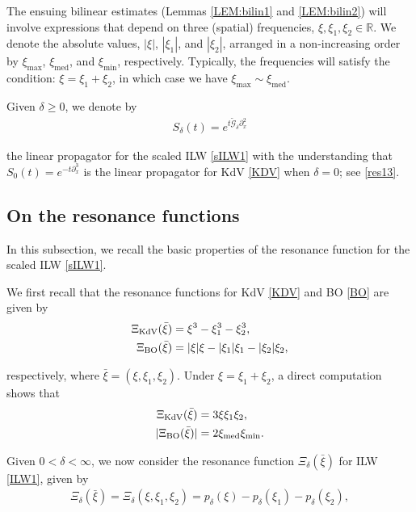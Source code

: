 \documentclass[letterpaper, 11pt,  reqno]{amsart}
\DeclareMathOperator{\med}{med}
\newcommand{\1}{\hspace{0.5mm}\textup{I}\hspace{0.5mm}}
\newcommand{\noi}{\noindent}
\newcommand{\R}{\mathbb{R}}
\newcommand{\dl}{\delta}
\newcommand{\wt}{\widetilde}
\newcommand{\dx}{\partial_x}
\newcommand{\Gd}{\wt{\mathcal{G}}_\dl}
\newcommand{\BO}{\text{\rm BO} }
\newcommand{\KDV}{\text{\rm KdV} }
\numberwithin{equation}{section}
\numberwithin{theorem}{section}
\begin{document}
The ensuing bilinear estimates (Lemmas \ref{LEM:bilin1}
and
\ref{LEM:bilin2})
will involve expressions that depend on three 
(spatial) frequencies, $\xi, \xi_1, \xi_2 \in \R$. 
We denote the absolute values,  $|\xi|$, $|\xi_1|$, and $|\xi_2|$,
arranged in a non-increasing order by 
 $\xi_{\max}$, 
$\xi_{\med}$, and $\xi_{\min}$, respectively. Typically, the frequencies will satisfy the
 condition: \(\xi = \xi_1 + \xi_2\), in which case we  have \(\xi_{\max}\sim \xi_{\med}\).





Given $\dl \ge 0$, 
we denote
by  
\begin{align}
S_\dl(t) = e^{ t \Gd \dx^2}
\label{lin1}
\end{align}


\noi
 the linear propagator for the scaled ILW \eqref{sILW1}
with the understanding that 
$S_0(t) = e^{-t\dx^3}$ 
is 
 the linear propagator for KdV \eqref{KDV}
 when $\dl = 0$;
 see \eqref{res13}.


\subsection{On the resonance functions}
\label{SUBSEC:res}

In this subsection, we recall the basic properties
of the resonance function for the scaled ILW \eqref{sILW1}.







We first recall that the resonance functions
for KdV \eqref{KDV} and BO \eqref{BO} are given by
\begin{align}
\Xi_\KDV (\bar \xi) &= \xi^3-  \xi_1^3 - \xi_2^3,\notag \\
\Xi_\BO (\bar \xi) &=  |\xi| \xi -  | \xi_1 |\xi_1 - |\xi_2| \xi_2,\label{res2}
\end{align}

\noi
respectively, 
where \(\bar\xi = (\xi,\xi_1,\xi_2)\).
Under $\xi = \xi_1+ \xi_2$, a direct computation shows that 
\begin{align}
\Xi_\KDV (\bar \xi) &= 3\xi \xi_1 \xi_2,\label{res1}\\
|\Xi_{\BO}(\bar \xi)| &= 2\xi_{\med}\xi_{\min}\label{res3}.
\end{align}




Given $0 < \dl < \infty$, 
we now consider the resonance function $\Xi_\dl (\bar \xi)$ for  ILW \eqref{ILW1}, given by 
\begin{align}
\Xi_\dl (\bar \xi)
= \Xi_\dl(\xi,\xi_1,\xi_2) =  p_\dl(\xi)  -   p_\dl(\xi_1) -  p_\dl(\xi_2), 
\label{res4}
\end{align}
\end{document}
